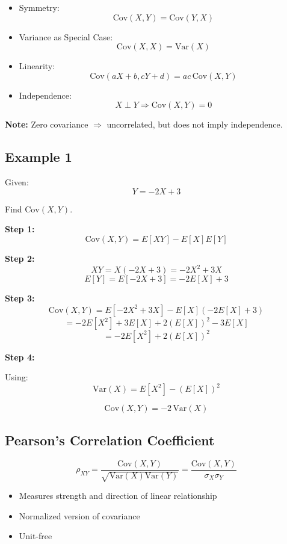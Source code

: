 \documentclass[12pt]{article}
\begin{document}
\begin{itemize}
\item Symmetry:
\[
\text{Cov}(X,Y) = \text{Cov}(Y,X)
\]

\item Variance as Special Case:
\[
\text{Cov}(X,X) = \text{Var}(X)
\]

\item Linearity:
\[
\text{Cov}(aX + b, cY + d) = ac\,\text{Cov}(X,Y)
\]

\item Independence:
\[
X \perp Y \Rightarrow \text{Cov}(X,Y) = 0
\]
\end{itemize}

\textbf{Note:} Zero covariance $\Rightarrow$ uncorrelated, but does not imply independence.

\subsection{Example 1}

Given:
\[
Y = -2X + 3
\]

Find $\text{Cov}(X,Y)$.

\textbf{Step 1:}
\[
\text{Cov}(X,Y) = E[XY] - E[X]E[Y]
\]

\textbf{Step 2:}
\[
XY = X(-2X + 3) = -2X^2 + 3X
\]
\[
E[Y] = E[-2X + 3] = -2E[X] + 3
\]

\textbf{Step 3:}
\[
\text{Cov}(X,Y) = E[-2X^2 + 3X] - E[X](-2E[X] + 3)
\]
\[
= -2E[X^2] + 3E[X] + 2(E[X])^2 - 3E[X]
\]
\[
= -2E[X^2] + 2(E[X])^2
\]

\textbf{Step 4:}

Using:
\[
\text{Var}(X) = E[X^2] - (E[X])^2
\]

\[
\text{Cov}(X,Y) = -2\,\text{Var}(X)
\]

\subsection{Pearson’s Correlation Coefficient}

\[
\rho_{XY} = \frac{\text{Cov}(X,Y)}{\sqrt{\text{Var}(X)\text{Var}(Y)}} = \frac{\text{Cov}(X,Y)}{\sigma_X \sigma_Y}
\]

\begin{itemize}
\item Measures strength and direction of linear relationship
\item Normalized version of covariance
\item Unit-free
\end{itemize}
\end{document}
